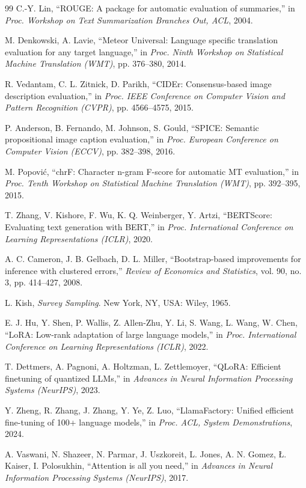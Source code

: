 \begin{thebibliography}{99}
 C.-Y. Lin, ``ROUGE: A package for automatic evaluation of summaries,''
in \emph{Proc. Workshop on Text Summarization Branches Out, ACL}, 2004.

 M. Denkowski, A. Lavie, ``Meteor Universal: Language specific
translation evaluation for any target language,'' in \emph{Proc. Ninth Workshop on
Statistical Machine Translation (WMT)}, pp. 376--380, 2014.

 R. Vedantam, C. L. Zitnick, D. Parikh, ``CIDEr: Consensus-based image
description evaluation,'' in \emph{Proc. IEEE Conference on Computer Vision and Pattern
Recognition (CVPR)}, pp. 4566--4575, 2015.

 P. Anderson, B. Fernando, M. Johnson, S. Gould, ``SPICE: Semantic
propositional image caption evaluation,'' in \emph{Proc. European Conference on Computer
Vision (ECCV)}, pp. 382--398, 2016.

 M. Popović, ``chrF: Character n-gram F-score for automatic MT evaluation,''
in \emph{Proc. Tenth Workshop on Statistical Machine Translation (WMT)}, pp. 392--395, 2015.

 T. Zhang, V. Kishore, F. Wu, K. Q. Weinberger, Y. Artzi, ``BERTScore:
Evaluating text generation with BERT,'' in \emph{Proc. International Conference on Learning
Representations (ICLR)}, 2020.

 A. C. Cameron, J. B. Gelbach, D. L. Miller, ``Bootstrap-based
improvements for inference with clustered errors,'' \emph{Review of Economics and
Statistics}, vol. 90, no. 3, pp. 414--427, 2008.

 L. Kish, \emph{Survey Sampling}. New York, NY, USA: Wiley, 1965.

 E. J. Hu, Y. Shen, P. Wallis, Z. Allen-Zhu, Y. Li, S. Wang, L. Wang,
W. Chen, ``LoRA: Low-rank adaptation of large language models,'' in \emph{Proc.
International Conference on Learning Representations (ICLR)}, 2022.

 T. Dettmers, A. Pagnoni, A. Holtzman, L. Zettlemoyer, ``QLoRA: Efficient
finetuning of quantized LLMs,'' in \emph{Advances in Neural Information Processing
Systems (NeurIPS)}, 2023.

 Y. Zheng, R. Zhang, J. Zhang, Y. Ye, Z. Luo, ``LlamaFactory:
Unified efficient fine-tuning of 100+ language models,'' in \emph{Proc. ACL, System
Demonstrations}, 2024.

 A. Vaswani, N. Shazeer, N. Parmar, J. Uszkoreit, L. Jones,
A. N. Gomez, {\L}. Kaiser, I. Polosukhin, ``Attention is all you need,'' in \emph{Advances
in Neural Information Processing Systems (NeurIPS)}, 2017.


\end{thebibliography}
